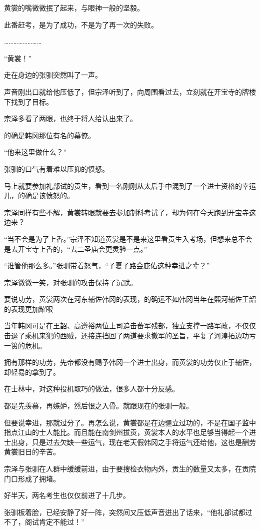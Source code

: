 黄裳的嘴微微抿了起来，与眼神一般的坚毅。

此番赶考，是为了成功，不是为了再一次的失败。

……………………

“黄裳！”

走在身边的张驯突然叫了一声。

声音刚出口就给他压低了，但宗泽听到了，向周围看过去，立刻就在开宝寺的牌楼下找到了目标。

宗泽多看了两眼，也终于将人给认出来了。

的确是韩冈那位有名的幕僚。

“他来这里做什么？”

张驯的口气有着难以压抑的愤怒。

马上就要参加礼部试的贡生，看到一名刚刚从太后手中混到了一个进士资格的幸运儿，的确是该愤怒的。

宗泽同样有些不解，黄裳转眼就要去参加制科考试了，却为何在今天跑到开宝寺这边来？

“当不会是为了上香。”宗泽不知道黄裳是不是来这里看贡生入考场，但想来总不会是去开宝寺上香的，“去二圣庙会更灵验一点。”

“谁管他那么多。”张驯带着怒气，“子夏子路会庇佑这种幸进之辈？”

宗泽微微一笑，对张驯的攻击保持了沉默。

要说功劳，黄裳两次在河东辅佐韩冈的表现，的确远不如韩冈当年在熙河辅佐王韶的表现更加耀眼

当年韩冈可是在王韶、高遵裕两位上司追击蕃军残部，独立支撑一路军政，不仅仅击退了乘机来犯的西贼，还接连挡回了两道要求撤军的圣旨，平复了河湟拓边功亏一篑的危机。

拥有那样的功劳，先帝都没有赐予韩冈一个进士出身，而黄裳的功劳仅止于辅佐，却轻易的拿到了。

在士林中，对这种投机取巧的做法，很多人都十分反感。

都是先羡慕，再嫉妒，然后恨之入骨。就跟现在的张驯一般。

但要说幸进，那就过分了。再怎么说，黄裳都是在边疆立过功的，不是在国子监中指点江山的士人能比。而且能在南剑州拔贡，黄裳本人的水平也足够当得起一个进士出身，只是过去欠缺一些运气，现在老天假韩冈之手将运气还给他，这也是酬劳黄裳旧日的辛苦。

宗泽与张驯在人群中缓缓前进，由于要搜检衣物内外，贡生的数量又太多，在贡院门口形成了拥堵。

好半天，两名考生也仅仅前进了十几步。

张驯板着脸，已经安静了好一阵，突然间又压低声音迸出了话来，“他礼部试都过不了，阁试肯定不能过！”

